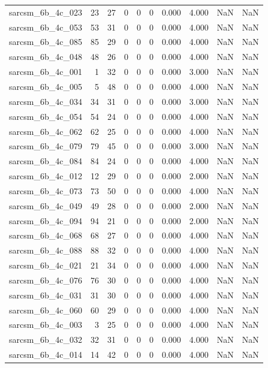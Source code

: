 \documentclass{article}
\begin{document}
\begin{longtable}{lrrrrrrrrr}
sarcsm\_6b\_4c\_023 & 23 & 27 & 0 & 0 & 0 & 0.000 & 4.000 & NaN & NaN \\
sarcsm\_6b\_4c\_053 & 53 & 31 & 0 & 0 & 0 & 0.000 & 4.000 & NaN & NaN \\
sarcsm\_6b\_4c\_085 & 85 & 29 & 0 & 0 & 0 & 0.000 & 4.000 & NaN & NaN \\
sarcsm\_6b\_4c\_048 & 48 & 26 & 0 & 0 & 0 & 0.000 & 4.000 & NaN & NaN \\
sarcsm\_6b\_4c\_001 & 1 & 32 & 0 & 0 & 0 & 0.000 & 3.000 & NaN & NaN \\
sarcsm\_6b\_4c\_005 & 5 & 48 & 0 & 0 & 0 & 0.000 & 4.000 & NaN & NaN \\
sarcsm\_6b\_4c\_034 & 34 & 31 & 0 & 0 & 0 & 0.000 & 3.000 & NaN & NaN \\
sarcsm\_6b\_4c\_054 & 54 & 24 & 0 & 0 & 0 & 0.000 & 4.000 & NaN & NaN \\
sarcsm\_6b\_4c\_062 & 62 & 25 & 0 & 0 & 0 & 0.000 & 4.000 & NaN & NaN \\
sarcsm\_6b\_4c\_079 & 79 & 45 & 0 & 0 & 0 & 0.000 & 3.000 & NaN & NaN \\
sarcsm\_6b\_4c\_084 & 84 & 24 & 0 & 0 & 0 & 0.000 & 4.000 & NaN & NaN \\
sarcsm\_6b\_4c\_012 & 12 & 29 & 0 & 0 & 0 & 0.000 & 2.000 & NaN & NaN \\
sarcsm\_6b\_4c\_073 & 73 & 50 & 0 & 0 & 0 & 0.000 & 4.000 & NaN & NaN \\
sarcsm\_6b\_4c\_049 & 49 & 28 & 0 & 0 & 0 & 0.000 & 2.000 & NaN & NaN \\
sarcsm\_6b\_4c\_094 & 94 & 21 & 0 & 0 & 0 & 0.000 & 2.000 & NaN & NaN \\
sarcsm\_6b\_4c\_068 & 68 & 27 & 0 & 0 & 0 & 0.000 & 4.000 & NaN & NaN \\
sarcsm\_6b\_4c\_088 & 88 & 32 & 0 & 0 & 0 & 0.000 & 4.000 & NaN & NaN \\
sarcsm\_6b\_4c\_021 & 21 & 34 & 0 & 0 & 0 & 0.000 & 4.000 & NaN & NaN \\
sarcsm\_6b\_4c\_076 & 76 & 30 & 0 & 0 & 0 & 0.000 & 4.000 & NaN & NaN \\
sarcsm\_6b\_4c\_031 & 31 & 30 & 0 & 0 & 0 & 0.000 & 4.000 & NaN & NaN \\
sarcsm\_6b\_4c\_060 & 60 & 29 & 0 & 0 & 0 & 0.000 & 4.000 & NaN & NaN \\
sarcsm\_6b\_4c\_003 & 3 & 25 & 0 & 0 & 0 & 0.000 & 4.000 & NaN & NaN \\
sarcsm\_6b\_4c\_032 & 32 & 31 & 0 & 0 & 0 & 0.000 & 4.000 & NaN & NaN \\
sarcsm\_6b\_4c\_014 & 14 & 42 & 0 & 0 & 0 & 0.000 & 4.000 & NaN & NaN \\

\end{longtable}
\end{document}
